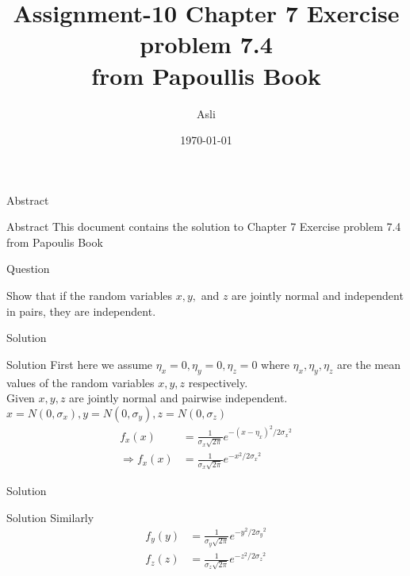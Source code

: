\documentclass{beamer}
\title{ Assignment-10 Chapter 7 Exercise problem 7.4 \\
from Papoullis Book}
\author{Asli}
\institute{IIT Hyderabad}
\date{\today }
\begin{document}
\begin{frame}
      \titlepage
\end{frame}



\begin{frame}{Abstract}
     \begin{block}{Abstract}
          This document contains the solution to Chapter 7 Exercise problem 7.4 from Papoulis Book
      \end{block}
\end{frame}


\begin{frame}{Question}
\begin{block}
Show that if the random variables $x,y,$ and $z$ are jointly normal and independent in pairs, they are independent.
\end{block}
\end{frame}



\begin{frame}{Solution}
\begin{block}{Solution}
First here we assume $\eta_x = 0 ,\eta_y = 0 ,\eta_z = 0 $ where $\eta_x,\eta_y,\eta_z$ are the mean values of the random variables $x,y,z$ respectively.\\
Given $x,y,z$ are jointly normal and pairwise independent.\\
$x = N(0,\sigma_x) , y = N(0,\sigma_y) , z = N(0,\sigma_z)$\\
\begin{align}
f_x(x) &= \frac{1}{\sigma_x\sqrt{2\pi}} e^{-{(x-\eta_x)}^{2}/2        {\sigma_x}^{2}} \\
\Rightarrow f_x(x) &= \frac{1}{\sigma_x\sqrt{2\pi}} e^{-x^{2}/2{\sigma_x}^{2}} 
\end{align}
\end{block}
\end{frame}


\begin{frame}{Solution }
\begin{block}{Solution}
    Similarly 
\begin{align}
f_y(y) &= \frac{1}{\sigma_y\sqrt{2\pi}} e^{-y^{2}/2{\sigma_y}^{2}} \\
f_z(z) &= \frac{1}{\sigma_z\sqrt{2\pi}} e^{-z^{2}/2{\sigma_z}^{2}}
\end{align}
\end{block}
\end{frame}
\end{document}
